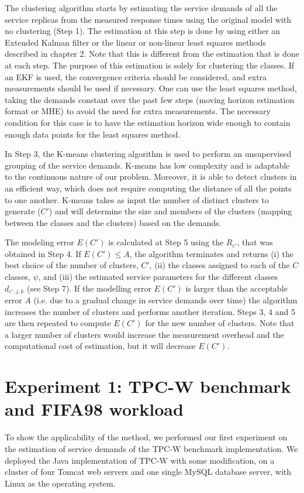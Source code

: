The clustering algorithm starts by estimating the service demands of all the service replicas from the measured response times using the original model with no clustering (Step 1). The estimation at this step is done by using either an Extended Kalman filter or the linear or non-linear least squares methods described in chapter 2.
Note that this is different from the estimation that is done at each step. The purpose of this estimation is solely for clustering the classes. 
If an EKF is used, the convergence criteria should be considered, and extra measurements should be used if necessary.  One can use the least squares method, taking the demands constant over the past few steps (moving horizon estimation format or MHE) to avoid the need for extra measurements. The necessary condition for this case is to have the estimation horizon wide enough to contain enough data points for the least squares method.   

In Step 3, the K-means clustering algorithm \cite{kaufman_finding_1990,likas_global_2003} is used to perform an unsupervised grouping of the service demands. K-means has low complexity and is adaptable to the continuous nature of our problem. Moreover, it is able to detect clusters in an efficient way, which does not require computing the distance of all the points to one another. K-means takes as input the number of distinct clusters to generate ($C'$) and will determine the size and members of the clusters (mapping between the classes and the clusters) based on the demands. 

The modeling error $E(C')$ is calculated at Step 5 using the $R_{c'}$, that was obtained in Step 4. If $E(C')\le A$, the algorithm terminates and returns (i) the best choice of the number of clusters, $C'$, (ii) the classes assigned to each of the $C$ classes, $\psi$, and (iii) the estimated service parameters for the different classes $d_{c',j,k}$ (see Step 7). 
 If the modelling error $E(C')$ is larger than the acceptable error $A$ (i.e. due to a gradual change in service demands over time) the algorithm increases the number of clusters and performs another iteration. Steps 3, 4 and 5 are then repeated to compute $E(C')$ for the new number of clusters. Note that a larger number of clusters would increase the measurement overhead and the computational cost of estimation, but it will decrease $E(C')$. 

\section{Experiment 1: TPC-W benchmark and FIFA98 workload}    
To show the applicability of the method, we performed our first experiment on the estimation of service demands of the TPC-W benchmark \cite{garcia2003tpc} implementation. We deployed the Java implementation of TPC-W \cite{volker_turau_tpc-w_????} with some modification, on a cluster of four Tomcat web servers and one single MySQL database server, with Linux as the operating system. 

